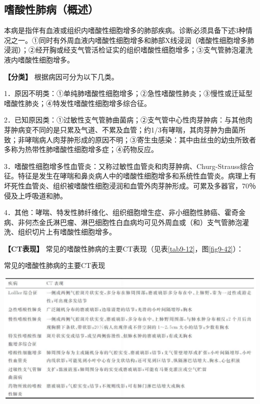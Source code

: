 \subsection{嗜酸性肺病（概述）}

本病是指伴有血液或组织内嗜酸性细胞增多的肺部疾病。诊断必须具备下述3种情况之一。①同时有外周血液内嗜酸性细胞增多和肺部X线浸润（嗜酸性细胞增多肺浸润）；②经开胸或经支气管活检证实的组织嗜酸性细胞增多；③支气管肺泡灌洗液内嗜酸性细胞增多。

\textbf{【分类】} 根据病因可分为以下几类。

1．原因不明类：①单纯肺嗜酸性细胞增多；②急性嗜酸性肺炎；③慢性或迁延型嗜酸性肺炎；④特发性嗜酸性细胞增多综合征。

2．已知原因类：①过敏性支气管肺曲菌病；②支气管中心性肉芽肿病：与其他肉芽肿病变不同的是只累及气道、不累及血管；约1/3有哮喘，其肉芽肿为曲菌所致；非哮喘病人肉芽肿形成的原因不明；③寄生虫感染：其中由丝虫的幼虫所致者多称为热带性肺嗜酸性细胞增多症；④药物反应。

3．嗜酸性细胞增多性血管炎：又称过敏性血管炎和肉芽肿病、Churg-Strauss综合征。特征是发生在哮喘和鼻炎病人中的嗜酸性细胞增多和系统性血管炎。病理上有坏死性血管炎、组织被嗜酸性细胞浸润和血管外肉芽肿形成。可累及多器官，70％侵及上呼吸道和肺。

4．其他：哮喘、特发性肺纤维化、组织细胞增生症、非小细胞性肺癌、霍奇金病、非何杰金氏淋巴瘤、淋巴细胞性白血病均可见外周血或（和）支气管肺泡灌洗、组织切片上有嗜酸性细胞增多。

\textbf{【CT表现】} 常见的嗜酸性肺病的主要CT表现（见表\ref{tab9-12}，图\ref{fig9-42}）：

\begin{table}[htbp]
\centering
\caption{常见的嗜酸性肺病的主要CT表现}
\label{tab9-12}
\includegraphics[width=\textwidth,height=\textheight,keepaspectratio]{./images/Image00238.jpg}
\end{table}

